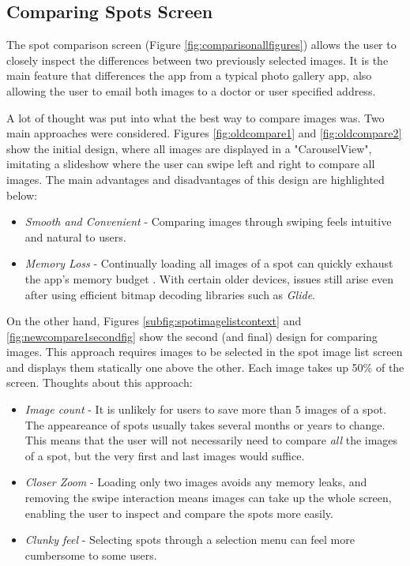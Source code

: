 \subsection{Comparing Spots Screen} \label{CompareScreenDesignSection}

The spot comparison screen (Figure \ref{fig:comparisonallfigures}) allows the user to closely inspect the differences between two previously selected images. It is the main feature that differences the app from a typical photo gallery app, also allowing the user to email both images to a doctor or user specified address.

A lot of thought was put into what the best way to compare images was. Two main approaches were considered. Figures \ref{fig:oldcompare1} and \ref{fig:oldcompare2} show the initial design, where all images are displayed in a "CarouselView", imitating a slideshow where the user can swipe left and right to compare all images. The main advantages and disadvantages of this design are highlighted below:
\begin{itemize}
    \item \emph{Smooth and Convenient} - Comparing images through swiping feels intuitive and natural to users.
    \item \emph{Memory Loss} - Continually loading all images of a spot can quickly exhaust the app's memory budget \cite{handlingbitmaps}. With certain older devices, issues still arise even after using efficient bitmap decoding libraries such as \emph{Glide}.
\end{itemize}

On the other hand, Figures \ref{subfig:spotimagelistcontext} and \ref{fig:newcompare1secondfig} show the second (and final) design for comparing images. This approach requires images to be selected in the spot image list screen and displays them statically one above the other. Each image takes up 50\% of the screen. Thoughts about this approach:
\begin{itemize}
    \item \emph{Image count} - It is unlikely for users to save more than 5 images of a spot. The appeareance of spots usually takes several months or years to change. This means that the user will not necessarily need to compare \emph{all} the images of a spot, but the very first and last images would suffice.
    \item \emph{Closer Zoom} - Loading only two images avoids any memory leaks, and removing the swipe interaction means images can take up the whole screen, enabling the user to inspect and compare the spots more easily.
    \item \emph{Clunky feel} - Selecting spots through a selection menu can feel more cumbersome to some users.
\end{itemize}

